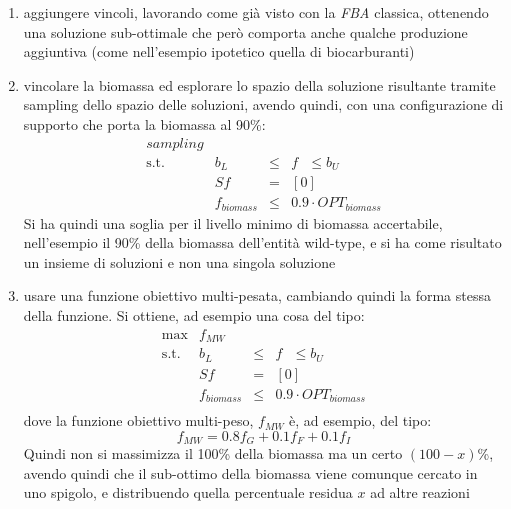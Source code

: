 \documentclass[a4paper,12pt, oneside]{book}
\begin{document}
\begin{enumerate}
  \item aggiungere vincoli, lavorando come già visto con la \textit{FBA}
  classica, ottenendo una soluzione sub-ottimale che però comporta anche qualche
  produzione aggiuntiva (come nell'esempio ipotetico quella di biocarburanti)
  \item vincolare la biomassa ed esplorare lo spazio della soluzione risultante
  tramite sampling dello spazio delle soluzioni, avendo quindi, con una
  configurazione di supporto che porta la biomassa al 90\%:
  \begin{equation*}
    \begin{array}{rrclcl}
      \displaystyle sampling\\
      \textrm{s.t.} & b_L & \leq & f\,\,\,\,  \leq b_{U} \\
                    & Sf & = & [0] \\
                    & f_{biomass} & \leq & 0.9 \cdot  OPT_{biomass} 
    \end{array}
  \end{equation*}
  Si ha quindi una soglia per il livello minimo di biomassa accertabile,
  nell'esempio il 90\% della biomassa dell'entità wild-type, e si ha
  come risultato un insieme di soluzioni e non una singola soluzione
  \item usare una funzione obiettivo multi-pesata, cambiando quindi la forma
  stessa della funzione. Si ottiene, ad esempio una cosa del tipo:
  \begin{equation*}
    \begin{array}{rrclcl}
      \displaystyle \max & f_{MW} \\
      \textrm{s.t.} & b_L & \leq & f\,\,\,\,  \leq b_{U} \\
                         & Sf & = & [0] \\
                         & f_{biomass} & \leq & 0.9 \cdot  OPT_{biomass} \\
    \end{array}
  \end{equation*}
  dove la funzione obiettivo multi-peso, $f_{MW}$ è, ad esempio, del tipo:
  \[f_{MW}=0.8f_{G}  +  0.1f_F +  0.1f_I\]
  Quindi non si massimizza il 100\% della biomassa ma un certo $(100-x)$\%,
  avendo quindi che il sub-ottimo della biomassa viene comunque cercato in uno
  spigolo, e distribuendo quella percentuale residua $x$ ad altre reazioni
\end{enumerate}
\end{document}
